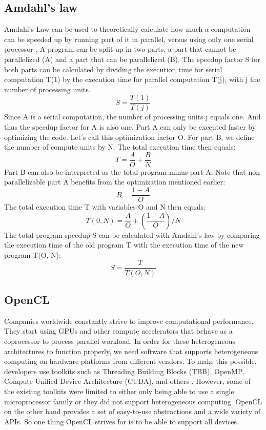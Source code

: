 \documentclass[a4paper, 11pt]{report}
\begin{document}
	\subsection{Amdahl's law}
Amdahl's Law can be used to theoretically calculate how much a computation can be speeded up by running part of it in parallel, versus using only one serial processor \cite{amdahlslaw}. A program can be split up in two parts, a part that cannot be parallelized (A) and a part that can be parallelized (B). The speedup factor S for both parts can be calculated by dividing the execution time for serial computation T(1) by the execution time for parallel computation T(j), with j the number of processing units.
\begin{equation}
	S = \frac{T(1)}{T(j)}
\end{equation}
Since A is a serial computation, the number of processing units j equals one. And thus the speedup factor for A is also one. Part A can only be executed faster by optimizing the code. Let's call this optimization factor O. For part B, we define the number of compute units by N. The total execution time then equals:
\begin{equation}
	T = \frac{A}{O} + \frac{B}{N}	
\end{equation}
Part B can also be interpreted as the total program minus part A. Note that non-parallelizable part A benefits from the optimization mentioned earlier:
\begin{equation}
	B = \frac{1-A}{O}
\end{equation}
The total execution time T with variables O and N then equals:
\begin{equation}
	T(0, N) = \frac{A}{O} + (\frac{1-A}{O})/N
\end{equation}
The total program speedup S can be calculated with Amdahl's law by comparing the execution time of the old program T with the execution time of the new program T(O, N):
\begin{equation}
	S  = \frac{T}{T(O, N)}
\end{equation}


\subsection{OpenCL}\label{subsec:OpenCL}

Companies worldwide constantly strive to improve computational performance. They start using GPUs and other compute accelerators that behave as a coprocessor to process parallel workload. In order for these heterogeneous architectures to function properly, we need software that supports heterogeneous computing on hardware platforms from different vendors. To make this possible, developers use toolkits such as Threading Building Blocks (TBB), OpenMP, Compute Unified Device Architecture (CUDA), and others \cite{stone2010opencl}. However, some of the existing toolkits were limited to either only being able to use a single microprocessor family or they did not support heterogeneous computing. OpenCL on the other hand provides a set of easy-to-use abstractions and a wide variety of APIs. So one thing OpenCL strives for is to be able to support all devices.
\end{document}
